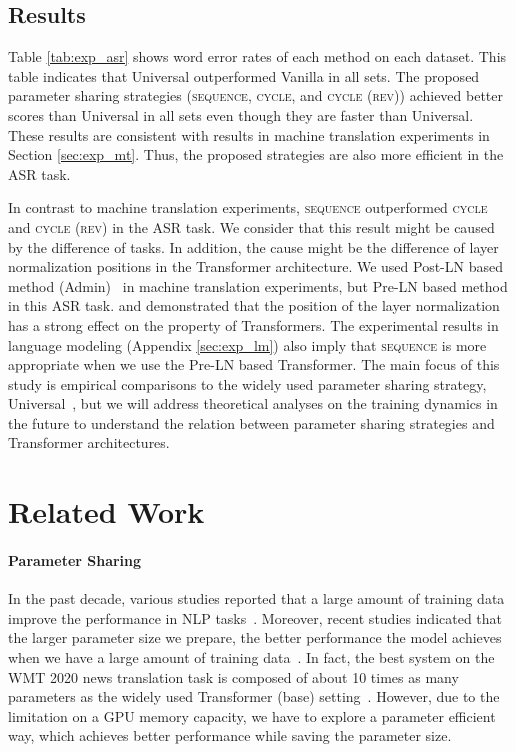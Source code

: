 \documentclass[11pt]{article}
\begin{document}
\subsection{Results}
Table \ref{tab:exp_asr} shows word error rates of each method on each dataset.
This table indicates that Universal outperformed Vanilla in all sets.
The proposed parameter sharing strategies (\textsc{sequence}, \textsc{cycle}, and \textsc{cycle (rev)}) achieved better scores than Universal in all sets even though they are faster than Universal.
These results are consistent with results in machine translation experiments in Section \ref{sec:exp_mt}.
Thus, the proposed strategies are also more efficient in the ASR task.


In contrast to machine translation experiments, \textsc{sequence} outperformed \textsc{cycle} and \textsc{cycle (rev)} in the ASR task.
We consider that this result might be caused by the difference of tasks.
In addition, the cause might be the difference of layer normalization positions in the Transformer architecture.
We used Post-LN based method (Admin)~\cite{liu-etal-2020-understanding} in machine translation experiments, but Pre-LN based method in this ASR task.
 and  demonstrated that the position of the layer normalization has a strong effect on the property of Transformers.
The experimental results in language modeling (Appendix \ref{sec:exp_lm}) also imply that \textsc{sequence} is more appropriate when we use the Pre-LN based Transformer.
The main focus of this study is empirical comparisons to the widely used parameter sharing strategy, Universal~\cite{dehghani2019}, but we will address theoretical analyses on the training dynamics in the future to understand the relation between parameter sharing strategies and Transformer architectures.



\section{Related Work}
\label{sec:relatedwork}
\paragraph{Parameter Sharing}
In the past decade, various studies reported that a large amount of training data improve the performance in NLP tasks~\cite{suzuki-isozaki-2008-semi,brants-etal-2007-large,NIPS2013_9aa42b31,sennrich:2016:backtrans,edunov-etal-2018-understanding}.
Moreover, recent studies indicated that the larger parameter size we prepare, the better performance the model achieves when we have a large amount of training data~\cite{devlin-etal-2019-bert,NEURIPS2020_1457c0d6}.
In fact, the best system on the WMT 2020 news translation task is composed of about 10 times as many parameters as the widely used Transformer (base) setting~\cite{kiyono-etal-2020-tohoku}.
However, due to the limitation on a GPU memory capacity, we have to explore a parameter efficient way, which achieves better performance while saving the parameter size.
\end{document}
